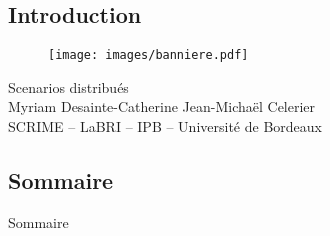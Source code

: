 \subsection*{Introduction}
\begin{frame} \begin{figure}{ \centering 
	\texttt{[image: images/banniere.pdf]} }\end{figure}
	\vspace{0.5cm}
	\begin{center}
		{\LARGE Scenarios distribués}\\[0.5cm]
		{\large Myriam Desainte-Catherine \hfill Jean-Michaël Celerier}\\
		\vfill
		SCRIME -- LaBRI -- IPB -- Université de Bordeaux
	\end{center}
\end{frame}

\subsection*{Sommaire}
\begin{frame}{Sommaire}
	\setlength{\columnsep}{2cm}
	\setlength{\columnseprule}{1pt}
	\begin{multicols}{2}
		\tableofcontents
	\end{multicols}
\end{frame}